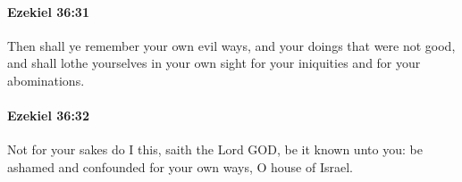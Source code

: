 		\paragraph{Ezekiel 36:31} %
			\label{EZEKIEL-36-31}

			Then shall ye remember your own evil ways, and your doings that were not good, and shall lothe yourselves in your own sight for your iniquities and for your abominations.


		\paragraph{Ezekiel 36:32} %
			\label{EZEKIEL-36-32}

			Not for your sakes do I this, saith the Lord GOD, be it known unto you: be ashamed and confounded for your own ways, O house of Israel.


